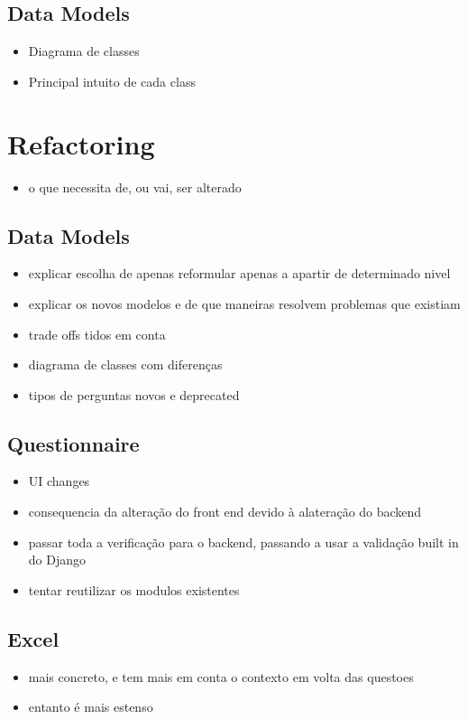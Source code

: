 \subsection{Data Models}
\begin{itemize}
    \item Diagrama de classes
    \item Principal intuito de cada class
\end{itemize}

\section{Refactoring}
\begin{itemize}
    \item o que necessita de, ou vai, ser alterado
\end{itemize}

\subsection{Data Models}
\begin{itemize}
    \item explicar escolha de apenas reformular apenas a apartir de determinado nivel
    \item explicar os novos modelos e de que maneiras resolvem problemas que existiam
    \item trade offs tidos em conta
    \item diagrama de classes com diferenças
    \item tipos de perguntas novos e deprecated
\end{itemize}

\subsection{Questionnaire}
\begin{itemize}
    \item UI changes
    \item consequencia da alteração do front end devido à alateração do backend
    \item passar toda a verificação para o backend, passando a usar a validação built in do Django
    \item tentar reutilizar os modulos existentes
\end{itemize}

\subsection{Excel}
\begin{itemize}
    \item mais concreto, e tem mais em conta o contexto em volta das questoes
    \item entanto é mais estenso
\end{itemize}
